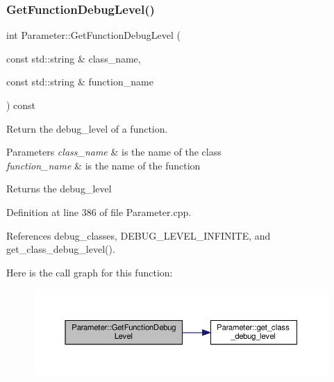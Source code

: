 \subsubsection{\texorpdfstring{Get\+Function\+Debug\+Level()}{GetFunctionDebugLevel()}}
{\footnotesize\ttfamily int Parameter\+::\+Get\+Function\+Debug\+Level (\begin{DoxyParamCaption}\item[{const std\+::string \&}]{class\+\_\+name,  }\item[{const std\+::string \&}]{function\+\_\+name }\end{DoxyParamCaption}) const}



Return the debug\+\_\+level of a function. 


\begin{DoxyParams}{Parameters}
{\em class\+\_\+name} & is the name of the class \\
\hline
{\em function\+\_\+name} & is the name of the function \\
\hline
\end{DoxyParams}
\begin{DoxyReturn}{Returns}
the debug\+\_\+level 
\end{DoxyReturn}


Definition at line 386 of file Parameter.\+cpp.



References debug\+\_\+classes, D\+E\+B\+U\+G\+\_\+\+L\+E\+V\+E\+L\+\_\+\+I\+N\+F\+I\+N\+I\+TE, and get\+\_\+class\+\_\+debug\+\_\+level().

Here is the call graph for this function\+:
\nopagebreak
\begin{figure}[H]
\begin{center}
\leavevmode
\includegraphics[width=350pt]{dc/dab/classParameter_ab9dec6e5f2b9176dee378c7103f9796d_cgraph}
\end{center}
\end{figure}
\mbox{\label{classParameter_adab70e796e929df46142e2be9cdd1145}} 
